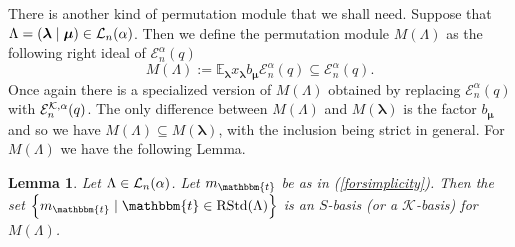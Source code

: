 \documentclass[10pt,a4,twoside,hidelinks,rm]{article}
\newcommand{\kk}{\mathcal{K}}
\newcommand\et{\mathbbm{t}}
\newcommand{\rstd}{{\rm RStd}}
\newcommand{\Ea}{ {\mathcal E}_n^{\alpha}(q)}
\newcommand{\Eak}{ {\mathcal E}_n^{ {\cal K}, \alpha}(q)}
\newcommand\blambda{{\boldsymbol\lambda}}
\newcommand\be{\mathbb{E}}
\newcommand\bmu{{\boldsymbol\mu}}
\theoremstyle{plain}
\newtheorem{lem}[teo]{Lemma}
\begin{document}
There is another kind of permutation module
that we shall need.
Suppose that
$ \Lambda = (\blambda \mid  \bmu ) \in {\cal L}_n(\alpha) $. Then we define
the permutation module $ M(\Lambda) $ as the following right ideal of $ \Ea$
\begin{equation}
M(\Lambda) := \be_{\blambda} x_{\blambda} b_{\bmu} \Ea  \subseteq \Ea.
\end{equation}
Once again there is a specialized version of $ M(\Lambda) $ obtained by replacing
$ \Ea $ with $ \Eak$.
The only difference between $ M(\Lambda)  $ and $ M(\blambda) $ is the factor $ b_{\bmu} $
and so we have $ M(\Lambda)  \subseteq M(\blambda) $, with the inclusion being strict in general.
For $ M(\Lambda) $ we have the following Lemma. 

\begin{lem}\label{descr2}
Let $ \Lambda \in  {\cal L}_n(\alpha)$. 
Let $ m_{\et }$  be as in (\ref{forsimplicity}). Then 
the set $\left\{ m_{\et } \mid \et \in \rstd(\Lambda) \right\} $ is an $S$-basis (or a $ \kk $-basis)
for $ M(\Lambda)  $.
\end{lem}
\end{document}
